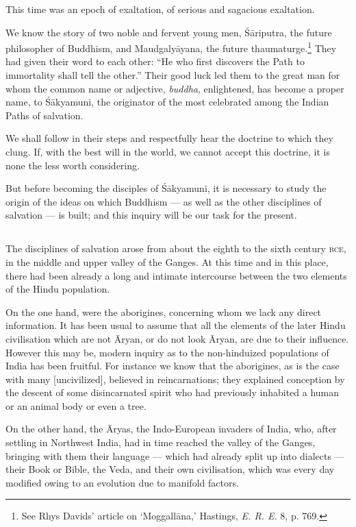 \documentclass[a4paper, 11pt, oneside, english]{article}
\begin{document}
This time was an epoch of exaltation, of serious and sagacious exaltation.

We know the story of two noble and fervent young men, Śāriputra, the future philosopher of Buddhism, and Maudgalyāyana, the future thaumaturge.\footnote{See Rhys Davids' article on `Moggallāna,' Hastings, \emph{E. R. E.} 8, p. 769.} They had given their word to each other: ``He who first discovers the Path to immortality shall tell the other.'' Their good luck led them to the great man for whom the common name or adjective, \emph{buddha}, enlightened, has become a proper name, to Śākyamuni, the originator of the most celebrated among the Indian Paths of salvation.

We shall follow in their steps and respectfully hear the doctrine to which they clung. If, with the best will in the world, we cannot accept this doctrine, it is none the less worth considering.

But before becoming the disciples of Śākyamuni, it is necessary to study the origin of the ideas on which Buddhism --- as well as the other disciplines of salvation --- is built; and this inquiry will be our task for the present.

\subsection{}
\paragraph{}
The disciplines of salvation arose from about the eighth to the sixth century \textsc{bce}, in the middle and upper valley of the Ganges. At this time and in this place, there had been already a long and intimate intercourse between the two elements of the Hindu population.

On the one hand, were the aborigines, concerning whom we lack any direct information. It has been usual to assume that all the elements of the later Hindu civilisation which are not Āryan, or do not look Āryan, are due to their influence. However this may be, modern inquiry as to the non-hinduized populations of India has been fruitful. For instance we know that the aborigines, as is the case with many [uncivilized], believed in reincarnations; they explained conception by the descent of some disincarnated spirit who had previously inhabited a human or an animal body or even a tree.

On the other hand, the Āryas, the Indo-European invaders of India, who, after settling in Northwest India, had in time reached the valley of the Ganges, bringing with them their language --- which had already split up into dialects --- their Book or Bible, the Veda, and their own civilisation, which was every day modified owing to an evolution due to manifold factors.
\end{document}
